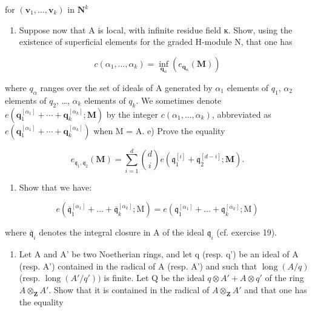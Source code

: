 for \((\mathbf{v}_1,\dots,\mathbf{v}_k)\) in \(\mathbf{N}^k\)

\begin{enumerate}
\def\labelenumi{\alph{enumi})}
\setcounter{enumi}{3}
\tightlist
\item
  Suppose now that A is local, with infinite residue field κ. Show, using the existence of superficial elements for the graded H-module N, that one has
\end{enumerate}

\[
c (\alpha_ {1}, \dots , \alpha_ {k}) = \inf _ {\mathbf {q} _ {\alpha}} (e _ {\mathbf {q} _ {\alpha}} (\mathbf {M}))
\]

where \(q_{\alpha}\) ranges over the set of ideals of A generated by \(\alpha_{1}\) elements of \(q_{1}\), \(\alpha_{2}\) elements of \(q_{2}\), \ldots, \(\alpha_{k}\) elements of \(q_{k}\). We sometimes denote \(e(\mathbf{q}_{1}^{[\alpha_{1}]} + \cdots + \mathbf{q}_{k}^{[\alpha_{k}]}; \mathbf{M})\) by the integer \(c(\alpha_{1}, \ldots, \alpha_{k})\), abbreviated as \(e(\mathbf{q}_{1}^{[\alpha_{1}]} + \cdots + \mathbf{q}_{k}^{[\alpha_{k}]})\) when M = A. e) Prove the equality

\[
e _ {\mathfrak {q} _ {1}, \mathfrak {q} _ {2}} (\mathbf {M}) = \sum_ {i = 1} ^ {d} \binom {d} {i} e (\mathfrak {q} _ {1} ^ {[ i ]} + \mathfrak {q} _ {2} ^ {[ d - i ]}; \mathbf {M}).
\]

\begin{enumerate}
\def\labelenumi{\alph{enumi})}
\setcounter{enumi}{5}
\tightlist
\item
  Show that we have:
\end{enumerate}

\[
e \left(\overline {{{\mathfrak {q}}}} _ {1} ^ {[ \alpha_ {1} ]} + \dots + \overline {{{\mathfrak {q}}}} _ {k} ^ {[ \alpha_ {k} ]}; \mathrm{M}\right) = e \left(\mathfrak {q} _ {1} ^ {[ \alpha_ {1} ]} + \dots + \mathfrak {q} _ {k} ^ {[ \alpha_ {k} ]}; \mathrm{M}\right)
\]

where \(\overline{\mathfrak{q}}_{i}\) denotes the integral closure in A of the ideal \(\mathfrak{q}_{i}\) (cf. exercise 19).

\begin{enumerate}
\def\labelenumi{\arabic{enumi})}
\setcounter{enumi}{20}
\tightlist
\item
  Let A and A' be two Noetherian rings, and let q (resp. q') be an ideal of A (resp. A') contained in the radical of A (resp. A') and such that \(\operatorname{long}(A/q)\) (resp. \(\operatorname{long}(A'/q'))\) is finite. Let Q be the ideal \(q \otimes A' + A \otimes q'\) of the ring \(A \otimes_{\mathbf{Z}} A'\). Show that it is contained in the radical of \(A \otimes_{\mathbf{Z}} A'\) and that one has the equality
\end{enumerate}

